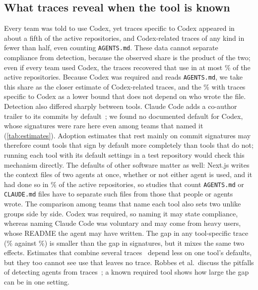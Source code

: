 \documentclass{article}
\begin{document}
\subsection{What traces reveal when the tool is known}
Every team was told to use Codex, yet traces specific to Codex appeared in about a fifth of the active repositories, and Codex-related traces of any kind in fewer than half, even counting \texttt{AGENTS.md}. These data cannot separate compliance from detection, because the observed share is the product of the two; even if every team used Codex, the traces recovered that use in at most \NRqTwoTracesCodexAnyPct\% of the active repositories. Because Codex was required and reads \texttt{AGENTS.md}, we take this share as the closer estimate of Codex-related traces, and the \NRqTwoTracesCodexSpecificPct\% with traces specific to Codex as a lower bound that does not depend on who wrote the file. Detection also differed sharply between tools. Claude Code adds a co-author trailer to its commits by default~\cite{claudecode2026attribution}; we found no documented default for Codex, whose signatures were rare here even among teams that named it (\cref{tab:estimates}). Adoption estimates that rest mainly on commit signatures may therefore count tools that sign by default more completely than tools that do not; running each tool with its default settings in a test repository would check this mechanism directly. The defaults of other software matter as well: Next.js writes the context files of two agents at once, whether or not either agent is used, and it had done so in \NRqTwoTracesContextExcludedNextjsPct\% of the active repositories, so studies that count \texttt{AGENTS.md} or \texttt{CLAUDE.md} files have to separate such files from those that people or agents wrote. The comparison among teams that name each tool also sets two unlike groups side by side. Codex was required, so naming it may state compliance, whereas naming Claude Code was voluntary and may come from heavy users, whose README the agent may have written. The gap in any tool-specific trace (\NRqTwoTracesSelfReportClaudeStrictSpecificGivenMentionPct\% against \NRqTwoTracesSelfReportCodexStrictSpecificGivenMentionPct\%) is smaller than the gap in signatures, but it mixes the same two effects. Estimates that combine several traces~\cite{robbes2026agenticmuch} depend less on one tool's defaults, but they too cannot see use that leaves no trace. Robbes et al.\ discuss the pitfalls of detecting agents from traces~\cite{robbes2026heuristics}; a known required tool shows how large the gap can be in one setting.
\end{document}

